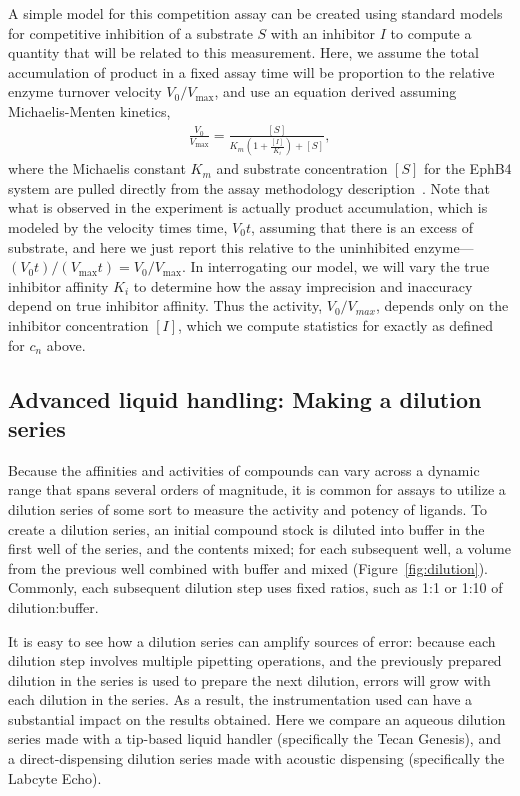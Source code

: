 \documentclass[aps,pre,twocolumn,nofootinbib,superscriptaddress,linenumbers]{revtex4-1}
\begin{document}
A simple model for this competition assay can be created using standard models for competitive inhibition of a substrate $S$ with an inhibitor $I$ to compute a quantity that will be related to this measurement. 
Here, we assume the total accumulation of product in a fixed assay time will be proportion to the relative enzyme turnover velocity $V_0 / V_\mathrm{max}$, and use an equation derived assuming Michaelis-Menten kinetics,
\begin{eqnarray}
\frac{V_{0}}{V_\mathrm{max}} = \frac{[S]}{K_{m}(1+\frac{[I]}{K_{i}})+[S]} \label{equation:competitive-inhibition} ,
\end{eqnarray}
where the Michaelis constant $K_{m}$ and substrate concentration $[S]$ for the EphB4 system are pulled directly from the assay methodology description~\cite{barlaam_novel_2009,barlaam_pyrimidine_2010}.
Note that what is observed in the experiment is actually product accumulation, which is modeled by the velocity times time, $V_0 t$, assuming that there is an excess of substrate, and here we just report this relative to the uninhibited enzyme---$(V_0 t) / (V_\mathrm{max} t) = V_0 / V_\mathrm{max}$.
In interrogating our model, we will vary the true inhibitor affinity $K_{i}$ to determine how the assay imprecision and inaccuracy depend on true inhibitor affinity.
Thus the activity, $V_{0}/V_{max}$, depends only on the inhibitor concentration $[I]$, which we compute statistics for exactly as defined for $c_n$ above.

\subsection*{Advanced liquid handling: Making a dilution series}

Because the affinities and activities of compounds can vary across a dynamic range that spans several orders of magnitude, it is common for assays to utilize a dilution series of some sort to measure the activity and potency of ligands. 
To create a dilution series, an initial compound stock is diluted into buffer in the first well of the series, and the contents mixed; for each subsequent well, a volume from the previous well combined with buffer and mixed (Figure~\ref{fig:dilution}).
Commonly, each subsequent dilution step uses fixed ratios, such as 1:1 or 1:10 of dilution:buffer.

It is easy to see how a dilution series can amplify sources of error:
because each dilution step involves multiple pipetting operations, and the previously prepared dilution in the series is used to prepare the next dilution, errors will grow with each dilution in the series.
As a result, the instrumentation used can have a substantial impact on the results obtained.
Here we compare an aqueous dilution series made with a tip-based liquid handler (specifically the Tecan Genesis), and a direct-dispensing dilution series made with acoustic dispensing (specifically the Labcyte Echo).
\end{document}

